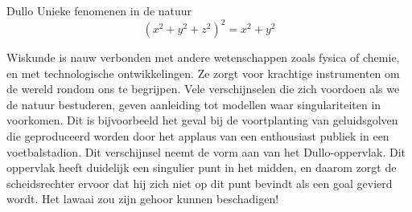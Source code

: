 \begin{surferPage}{Dullo}
Unieke fenomenen in de natuur\\
\smallskip
\[(x^2+ y^2+ z^2)^2	= x^2+ y^2\]

\singlespacing
Wiskunde is nauw verbonden met andere wetenschappen zoals fysica of chemie, en met technologische ontwikkelingen. Ze zorgt voor krachtige instrumenten om de wereld rondom ons te begrijpen. 
\singlespacing
Vele verschijnselen die zich voordoen als we de natuur bestuderen, geven aanleiding tot modellen waar singulariteiten in voorkomen.
\singlespacing
Dit is bijvoorbeeld het geval bij de voortplanting van geluidsgolven die geproduceerd worden door het applaus van een enthousiast publiek in een voetbalstadion. Dit verschijnsel neemt de vorm aan van het Dullo-oppervlak. Dit oppervlak heeft duidelijk een singulier punt in het midden, en daarom zorgt de scheidsrechter ervoor dat hij zich niet op dit punt bevindt als een goal gevierd wordt. Het lawaai zou zijn gehoor kunnen beschadigen!
\end{surferPage}
